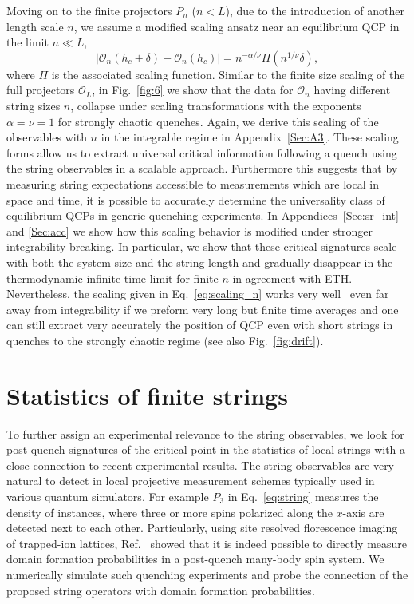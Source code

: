 \documentclass[aps,prx,twocolumn]{revtex4-2}
\begin{document}
Moving on to the finite projectors $P_n$ ($n<L$), due to the introduction of another length scale $n$, we assume a modified scaling ansatz near an equilibrium QCP in the limit $n\ll L$,
\begin{equation}\label{eq:scaling_n}
|\mathcal{O}_n(h_c+\delta)-\mathcal{O}_n(h_c)|=n^{-\alpha/\nu}\Pi(n^{1/\nu}\delta),
\end{equation}
where $\Pi$ is the associated  scaling function. Similar to the finite size scaling of the full projectors $\mathcal{O}_L$, in Fig.~\ref{fig:6} we show that the data for $\mathcal{O}_n$ having different string sizes $n$, collapse under scaling transformations with the exponents $\alpha=\nu=1$ for strongly chaotic quenches.  {Again, we derive this scaling of the observables with $n$ in the integrable regime in Appendix~\ref{Sec:A3}}. These scaling forms allow us to extract universal critical information following a quench using the string observables in a scalable approach. Furthermore this suggests that by measuring string expectations accessible to measurements which are local in space and time, it is possible to accurately determine the universality class of equilibrium QCPs in generic quenching experiments.  {In Appendices~\ref{Sec:sr_int} and \ref{Sec:acc} we show  {how this scaling behavior is modified} under stronger integrability breaking.   {In particular,  we show} that these critical signatures scale with both the system size and the string length and  {gradually disappear in the thermodynamic infinite time limit for finite $n$ in agreement with ETH.  Nevertheless, the scaling given in Eq.~\eqref{eq:scaling_n} works very well~ even far away from integrability if we preform very long but finite time averages and one can still extract very accurately the position of QCP even with short strings in quenches to the strongly chaotic regime (see also Fig.~\ref{fig:drift}).}}


\section{Statistics of finite strings}
\label{string_stat}


 {To further assign an experimental relevance to the string observables, we look for post quench signatures of the critical point in the statistics of local strings with a close connection to recent experimental results.   {The string observables are very natural to detect in local projective measurement schemes typically used in various quantum simulators.  For example $P_3$ in Eq.~\eqref{eq:string} measures the density of instances, where three or more spins polarized along the $x$-axis are detected next to each other. } Particularly,  using site resolved florescence imaging of trapped-ion lattices, Ref.~\cite{Zhang2017} showed that it is indeed possible to directly measure domain formation probabilities in a post-quench many-body spin system. We numerically simulate such quenching experiments and probe the connection of the proposed string operators with domain formation probabilities. }\\
\end{document}
